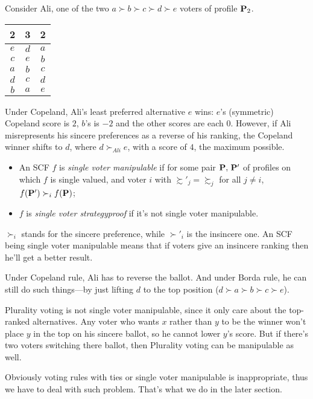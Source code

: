 Consider Ali, one of the two $a \succ b \succ c \succ d \succ e$ voters of profile $\mathbf{P}_2$.
\begin{center}
    \begin{tabular}{ccc}
        2 & 3 & 2\\
        \hline
        $e$ & $ d $ & $ a$\\
        $c $&$ e $&$ b$\\
        $a $&$ b $&$ c$\\
        $d $&$ c $&$ d$\\
        $b $&$ a $&$ e$
    \end{tabular}
\end{center}

Under Copeland, Ali's least preferred alternative $e$ wins: $e$'s (symmetric) Copeland score is $2$, $b$'s is $-2$ and the other scores are each $0$. However, if Ali misrepresents his sincere preferences as a reverse of his ranking, the Copeland winner shifts to $d$, where $d \succ_{Ali} e$, with a score of $4$, the maximum possible.

\begin{definition}
    \begin{itemize}
        \item An SCF $f$ is \textit{single voter manipulable} if for some pair $\mathbf{P},\, \mathbf{P}'$ of profiles on which $f$ is single valued, and voter $i$ with $\succsim'_j = \succsim_j$ for all $j \neq i$, $f(\mathbf{P}') \succ_i f(\mathbf{P})$;
        \item $f$ is \textit{single voter strategyproof} if it's not single voter manipulable.
    \end{itemize}
\end{definition}

$\succ_i$ stands for the sincere preference, while $\succ'_i$ is the insincere one. An SCF being single voter manipulable means that if voters give an insincere ranking then he'll get a better result.

Under Copeland rule, Ali has to reverse the ballot. And under Borda rule, he can still do such things---by just lifting $d$ to the top position ($d \succ a \succ b \succ c \succ e$).

Plurality voting is not single voter manipulable, since it only care about the top-ranked alternatives. Any voter who wants $x$ rather than $y$ to be the winner won't place $y$ in the top on his sincere ballot, so he cannot lower $y$'s score. But if there's two voters switching there ballot, then Plurality voting can be manipulable as well.

Obviously voting rules with ties or single voter manipulable is inappropriate, thus we have to deal with such problem. That's what we do in the later section.